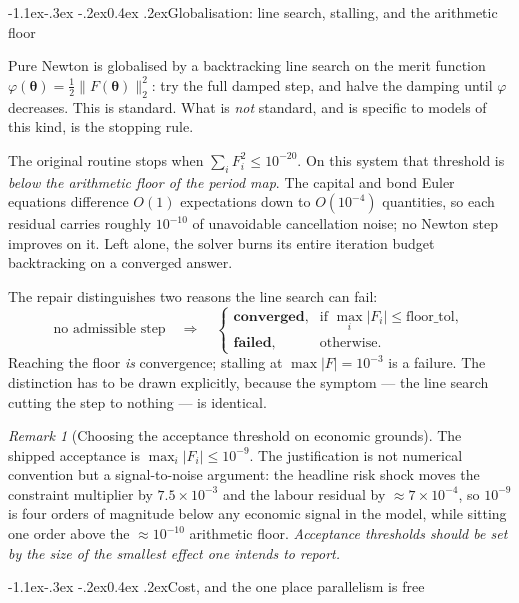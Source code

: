 \documentclass[10pt,a4paper]{article}
\makeatletter
\theoremstyle{definition}
\theoremstyle{plain}
\theoremstyle{remark}
\newtheorem{rem}[defn]{Remark}
\newcommand{\pol}{\bm{\theta}}
\newcommand{\half}{\tfrac{1}{2}}
\renewcommand\subsection{\@startsection{subsection}{2}{\z@}%
  {-1.1ex\@plus -.3ex \@minus -.2ex}{0.4ex \@plus .2ex}{\normalfont\normalsize\bfseries}}
\makeatother
\begin{document}
\subsection{Globalisation: line search, stalling, and the arithmetic floor}

Pure Newton is globalised by a backtracking line search on the merit function
$\varphi(\pol)=\half\|F(\pol)\|_2^2$: try the full damped step, and halve the damping until
$\varphi$ decreases. This is standard. What is \emph{not} standard, and is specific to models
of this kind, is the stopping rule.

The original routine stops when $\sum_i F_i^2 \le 10^{-20}$. On this system that threshold is
\emph{below the arithmetic floor of the period map}. The capital and bond Euler equations
difference $O(1)$ expectations down to $O(10^{-4})$ quantities, so each residual carries
roughly $10^{-10}$ of unavoidable cancellation noise; no Newton step improves on it. Left
alone, the solver burns its entire iteration budget backtracking on a converged answer.

The repair distinguishes two reasons the line search can fail:
\begin{equation}
  \text{no admissible step} \quad\Longrightarrow\quad
  \begin{cases}
    \textbf{converged}, & \text{if } \max_i|F_i| \le \text{floor\_tol},\\[2pt]
    \textbf{failed}, & \text{otherwise.}
  \end{cases}
\end{equation}
Reaching the floor \emph{is} convergence; stalling at $\max|F| = 10^{-3}$ is a failure. The
distinction has to be drawn explicitly, because the symptom --- the line search cutting the
step to nothing --- is identical.

\begin{rem}[Choosing the acceptance threshold on economic grounds]
The shipped acceptance is $\max_i|F_i| \le 10^{-9}$. The justification is not numerical
convention but a signal-to-noise argument: the headline risk shock moves the constraint
multiplier by $7.5\times10^{-3}$ and the labour residual by $\approx 7\times10^{-4}$, so
$10^{-9}$ is four orders of magnitude below any economic signal in the model, while sitting
one order above the $\approx 10^{-10}$ arithmetic floor. \emph{Acceptance thresholds should be
set by the size of the smallest effect one intends to report.}
\end{rem}

\subsection{Cost, and the one place parallelism is free}
\end{document}
